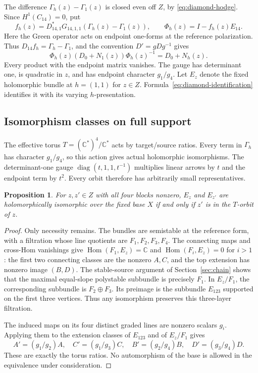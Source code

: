\documentclass[11pt]{amsart}
\newtheorem{proposition}[theorem]{Proposition}
\theoremstyle{definition}
\theoremstyle{remark}
\newcommand{\CC}{\mathbb C}
\newcommand{\Hom}{\operatorname{Hom}}
\newcommand{\diag}{\operatorname{diag}}
\begin{document}
The difference $\Gamma_h(z)-\Gamma_1(z)$ is closed even off $Z$, by
\eqref{eq:diamond-hodge}. Since $H^1(C_{14})=0$, put
\begin{equation}\label{eq:diamond-identification}
 f_h(z)=D_{14,1}^*G_{14,1,1}(\Gamma_h(z)-\Gamma_1(z)),\qquad
 \Phi_h(z)=I-f_h(z)E_{14}.
\end{equation}
Here the Green operator acts on endpoint one-forms at the reference
polarization. Thus $D_{14}f_h=\Gamma_h-\Gamma_1$, and the
convention $D'=gDg^{-1}$ gives
\[
 \Phi_h(z)(D_0+N_1(z))\Phi_h(z)^{-1}=D_0+N_h(z).
\]
Every product with the endpoint matrix vanishes. The gauge has determinant
one, is quadratic in $z$, and has endpoint character $g_1/g_4$.
Let $E_z$ denote the fixed holomorphic bundle at $h=(1,1)$ for $z\in Z$.
Formula~\eqref{eq:diamond-identification} identifies it with its varying
$h$-presentation.

\subsection{Isomorphism classes on full support}
The effective torus $T=(\CC^*)^4/\CC^*$ acts by target/source ratios.
Every term in $\Gamma_h$ has character $g_1/g_4$, so this action gives
actual holomorphic isomorphisms. The determinant-one gauge
$\diag(t,1,1,t^{-1})$ multiplies linear arrows by $t$ and the endpoint
term by $t^2$. Every orbit therefore has arbitrarily small representatives.

\begin{proposition}\label{prop:orbit-classification}
For $z,z'\in Z$ with all four blocks nonzero, $E_z$ and $E_{z'}$ are
holomorphically isomorphic over the fixed base $X$ if and only if $z'$ is
in the $T$-orbit of $z$.
\end{proposition}

\begin{proof}
Only necessity remains. The bundles are semistable at the reference form,
with a filtration whose line quotients are $F_1,F_2,F_3,F_4$. The
connecting maps and cross-Hom vanishings give
$\Hom(F_1,E_z)=\CC$ and $\Hom(F_i,E_z)=0$ for $i>1$:
the first two connecting classes are the nonzero $A,C$, and the top
extension has nonzero image $(B,D)$. The stable-source argument of
Section~\ref{sec:chain} shows that the maximal equal-slope polystable
subbundle is precisely $F_1$. In $E_z/F_1$, the corresponding subbundle
is $F_2\oplus F_3$. Its preimage is the subbundle $E_{123}$ supported
on the first three vertices. Thus any isomorphism preserves this
three-layer filtration.

The induced maps on its four distinct graded lines are nonzero scalars
$g_i$. Applying them to the extension classes of $E_{123}$ and of
$E_z/F_1$ gives
\[
 A'=(g_1/g_2)A,\quad C'=(g_1/g_3)C,\quad
 B'=(g_2/g_4)B,\quad D'=(g_3/g_4)D.
\]
These are exactly the torus ratios. No automorphism of the base is allowed
in the equivalence under consideration.
\end{proof}
\end{document}
